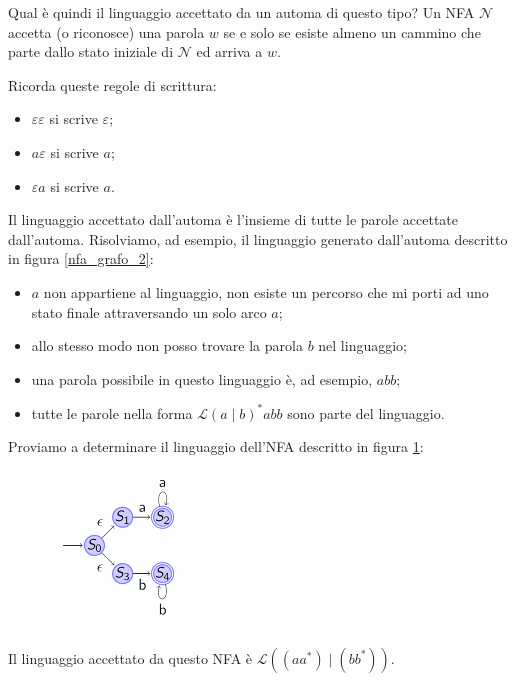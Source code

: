 \documentclass[class=book, crop=false, oneside, 12pt]{standalone}
\begin{document}
Qual è quindi il linguaggio accettato da un automa di questo tipo?\label{linguaggio_definito_da_un_automa} 
Un NFA \(\mathcal{N}\) accetta (o riconosce) una parola \(w\) se e solo se esiste almeno un cammino che parte dallo stato iniziale di \(\mathcal{N}\) ed arriva a \(w\).

Ricorda queste regole di scrittura:
\begin{itemize}
    \item \(\varepsilon \varepsilon\) si scrive \(\varepsilon\);
    \item \(a\varepsilon\) si scrive \(a\);
    \item \(\varepsilon a\) si scrive \(a\).
\end{itemize}

Il linguaggio accettato dall’automa è l’insieme di tutte le parole accettate dall’automa.
Risolviamo, ad esempio, il linguaggio generato dall’automa descritto in figura \ref{nfa_grafo_2}:
\begin{itemize}
    \item \(a\) non appartiene al linguaggio, non esiste un percorso che mi porti ad uno stato finale attraversando un solo arco \(a\);
    \item allo stesso modo non posso trovare la parola \(b\) nel linguaggio;
    \item una parola possibile in questo linguaggio è, ad esempio, \(abb\);
    \item tutte le parole nella forma \(\mathcal{L}(a \mid b)^\ast abb\) sono parte del linguaggio.
\end{itemize}

\noindent Proviamo a determinare il linguaggio dell'NFA descritto in figura \ref{nfa_grafo_3}:

\begin{figure}
    \centering
    \includegraphics[width=.3\textwidth,keepaspectratio]{nfa_grafo_3}
    \caption{}
    \label{nfa_grafo_3}
\end{figure}

\noindent Il linguaggio accettato da questo NFA è \(\mathcal{L}((a a^* ) \mid ( b b^\ast ))\).
\end{document}

